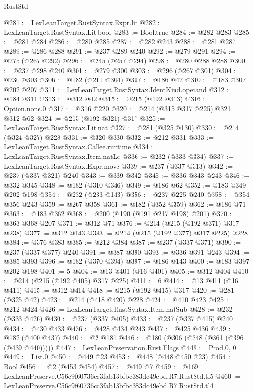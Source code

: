 \begin{lexlean}{RustStd}
\begin{coremodule}
@281 := LexLeanTarget.RustSyntax.Expr.lit
@282 := LexLeanTarget.RustSyntax.Lit.bool
@283 := Bool.true
@284 := @282 @283
@285 := @281 @284
@286 := @280 @285
@287 := @282 @243
@288 := @281 @287
@289 := @286 @288
@291 := @237 @289 @240
@292 := @279 @291
@294 := @275 (@267 @292)
@296 := @245 (@257 @294)
@298 := @280 @288 @288
@300 := @237 @298 @240
@301 := @279 @300
@303 := @296 (@267 @301)
@304 := @230 @303
@306 := @182 (@211 @304)
@307 := @186 @42
@310 := @183 @307 @202 @207
@311 := LexLeanTarget.RustSyntax.IdentKind.operand
@312 := @184 @311
@313 := @312 @42
@315 := @215 (@192 @313)
@316 := Option.none.{0}
@317 := @316 @220
@320 := @214 (@315 @317 @225)
@321 := @312 @62
@324 := @215 (@192 @321) @317
@325 := LexLeanTarget.RustSyntax.Lit.nat
@327 := @281 (@325 @130)
@330 := @214 (@324 @327) @228
@331 := @320 @330
@332 := @212 @331
@333 := LexLeanTarget.RustSyntax.Callee.runtime
@334 := LexLeanTarget.RustSyntax.Item.natLe
@336 := @232 (@333 @334)
@337 := LexLeanTarget.RustSyntax.Expr.move
@339 := @237 (@337 @313)
@342 := @237 (@337 @321) @240
@343 := @339 @342
@345 := @336 @343 @243
@346 := @332 @345
@348 := @182 (@310 @346)
@349 := @186 @62
@352 := @183 @349 @202 @198
@354 := @232 (@233 @143)
@356 := @237 @225 @240
@358 := @354 @356 @243
@359 := @267 @358
@361 := @182 (@352 @359)
@362 := @186 @71
@363 := @183 @362
@368 := @200 (@190 (@191 @217 @198) @201)
@370 := @363 @368 @207
@371 := @312 @71
@376 := @214 (@215 (@192 @371) @317 @238)
@377 := @312 @143
@383 := @214 (@215 (@192 @377) @317 @225) @228
@384 := @376 @383
@385 := @212 @384
@387 := @237 (@337 @371)
@390 := @237 (@337 @377) @240
@391 := @387 @390
@393 := @336 @391 @243
@394 := @385 @393
@396 := @182 (@370 @394)
@397 := @186 @143
@400 := @183 @397 @202 @198
@401 := 5
@404 := @13 @401 (@16 @401)
@405 := @312 @404
@410 := @214 (@215 (@192 @405) @317 @225)
@411 := 6
@414 := @13 @411 (@16 @411)
@415 := @312 @414
@418 := @215 (@192 @415) @317
@420 := @281 (@325 @42)
@423 := @214 (@418 @420) @228
@424 := @410 @423
@425 := @212 @424
@426 := LexLeanTarget.RustSyntax.Item.natSub
@428 := @232 (@333 @426)
@430 := @237 (@337 @405)
@433 := @237 (@337 @415) @240
@434 := @430 @433
@436 := @428 @434 @243
@437 := @425 @436
@439 := @182 (@400 @437)
@440 := @2 @181
@446 := @180 (@306 (@348 (@361 (@396 (@439 @440)))))
@447 := LexLeanPreservation.Rust.Flags
@448 := Prod.{0, 0}
@449 := List.{0}
@450 := @449 @23
@453 := @448 (@448 @450 @23)
@454 := Bool
@456 := @2 (@453 @454)
@457 := @449 @7
@459 := @169 LexLeanPreserve.C56c9f60736cc3fab13bfbc383dc49ebd.R7.RustStd.tl5
@460 := LexLeanPreserve.C56c9f60736cc3fab13bfbc383dc49ebd.R7.RustStd.tl4

\end{coremodule}
\end{lexlean}
